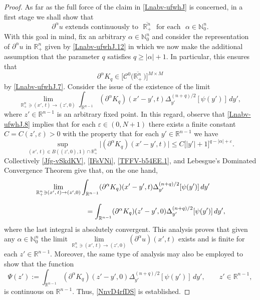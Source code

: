 \documentclass[11pt,reqno]{amsart}
\numberwithin{equation}{section}
\theoremstyle{remark}
\begin{document}
\begin{proof}
As far as the full force of the claim in \eqref{Lnabv-ufwhJ} is concerned, 
in a first stage we shall show that
%
\begin{equation}\label{NnvD4rfDS}
\partial^\alpha u\text{ extends continuously to }\,\,\overline{{\mathbb{R}}^n_{+}}
\,\,\text{ for each }\,\,\alpha\in{\mathbb{N}}_0^n.
\end{equation}
%
With this goal in mind, fix an arbitrary $\alpha\in{\mathbb{N}}_0^n$ and consider 
the representation of $\partial^\alpha u$ in ${\mathbb{R}}^n_{+}$ given 
by \eqref{Lnabv-ufwhJ.12} in which we now make the additional assumption that 
the parameter $q$ satisfies $q\geq|\alpha|+1$. In particular, this ensures that
%
\begin{equation}\label{Jfg-vSkdKV}
\partial^\alpha K_q\in\big[{\mathscr{C}}^{0}\big(\overline{{\mathbb{R}}^n_{+}}\,\big)\big]^{M\times M}
\end{equation}
%
by \eqref{Lnabv-ufwhJ.7}. Consider the issue of the existence of the limit 
%
\begin{equation}\label{LnaGV-rE}
\lim\limits_{{\mathbb{R}}^n_{+}\ni (x',\,t)\to (z',0)}\int_{{\mathbb{R}}^{n-1}}
(\partial^\alpha K_q)(x'-y',t)\Delta_{y'}^{(n+q)/2}[\psi(y')]\,dy',
\end{equation}
%
where $z'\in{\mathbb{R}}^{n-1}$ is an arbitrary fixed point. In this regard, observe that 
\eqref{Lnabv-ufwhJ.8} implies that for each $\varepsilon\in(0,N+1)$ there exists a finite constant 
$C=C(z',\varepsilon)>0$ with the property that for each $y'\in{\mathbb{R}}^{n-1}$ we have
%
\begin{equation}\label{IFsVNi}
\sup\limits_{(x',\,t)\in B((z',0),1)\cap{\mathbb{R}}^n_{+}}\big|(\partial^\alpha K_q)(x'-y',t)\big|
\leq C\big[|y'|+1\big]^{q-|\alpha|+\varepsilon}.
\end{equation}
%
Collectively \eqref{Jfg-vSkdKV}, \eqref{IFsVNi}, \eqref{TFFV-b54EE.1}, and 
Lebesgue's Dominated Convergence Theorem give that, on the one hand,  
%
\begin{align}\label{LnaGV-rE-B}
&\lim\limits_{{\mathbb{R}}^n_{+}\ni (x',\,t)\to (z',0)}\int_{{\mathbb{R}}^{n-1}}
(\partial^\alpha K_q)(x'-y',t)\Delta_{y'}^{(n+q)/2}[\psi(y')]\,dy'
\nonumber\\[6pt]
&\hskip 1.00in
=\int_{{\mathbb{R}}^{n-1}}(\partial^\alpha K_q)(z'-y',0)\Delta_{y'}^{(n+q)/2}[\psi(y')]\,dy',
\end{align}
%
where the last integral is absolutely convergent.
This analysis proves that given any $\alpha\in{\mathbb{N}}_0^n$ the limit
$\lim\limits_{{\mathbb{R}}^n_{+}\ni (x',\,t)\to (z',0)}(\partial^\alpha u)(x',t)$ 
exists and is finite for each $z'\in{\mathbb{R}}^{n-1}$. Moreover, the same 
type of analysis may also be employed to show that the function 
%
\begin{equation}\label{Lnahgfs-ii}
\Psi(z'):=\int_{{\mathbb{R}}^{n-1}}(\partial^\alpha K_q)(z'-y',0)
\Delta_{y'}^{(n+q)/2}[\psi(y')]\,dy',\qquad z'\in{\mathbb{R}}^{n-1},
\end{equation}
%
is continuous on ${\mathbb{R}}^{n-1}$. Thus, \eqref{NnvD4rfDS} is established.


\end{proof}
\end{document}
